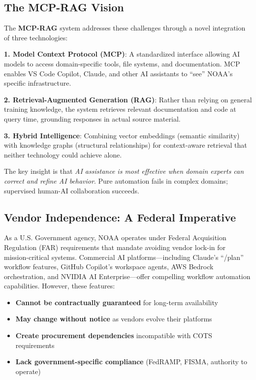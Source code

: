 \documentclass[11pt,letterpaper]{article}
\begin{document}
\subsection{The MCP-RAG Vision}

The \textbf{MCP-RAG} system addresses these challenges through a novel integration of three technologies:

\textbf{1. Model Context Protocol (MCP)}: A standardized interface allowing AI models to access domain-specific tools, file systems, and documentation. MCP enables VS Code Copilot, Claude, and other AI assistants to ``see'' NOAA's specific infrastructure.

\textbf{2. Retrieval-Augmented Generation (RAG)}: Rather than relying on general training knowledge, the system retrieves relevant documentation and code at query time, grounding responses in actual source material.

\textbf{3. Hybrid Intelligence}: Combining vector embeddings (semantic similarity) with knowledge graphs (structural relationships) for context-aware retrieval that neither technology could achieve alone.

The key insight is that \textit{AI assistance is most effective when domain experts can correct and refine AI behavior}. Pure automation fails in complex domains; supervised human-AI collaboration succeeds.

\subsection{Vendor Independence: A Federal Imperative}

As a U.S. Government agency, NOAA operates under Federal Acquisition Regulation (FAR) requirements that mandate avoiding vendor lock-in for mission-critical systems. Commercial AI platforms---including Claude's ``/plan'' workflow features, GitHub Copilot's workspace agents, AWS Bedrock orchestration, and NVIDIA AI Enterprise---offer compelling workflow automation capabilities. However, these features:

\begin{itemize}[leftmargin=*]
    \item \textbf{Cannot be contractually guaranteed} for long-term availability
    \item \textbf{May change without notice} as vendors evolve their platforms
    \item \textbf{Create procurement dependencies} incompatible with COTS requirements
    \item \textbf{Lack government-specific compliance} (FedRAMP, FISMA, authority to operate)
\end{itemize}
\end{document}
